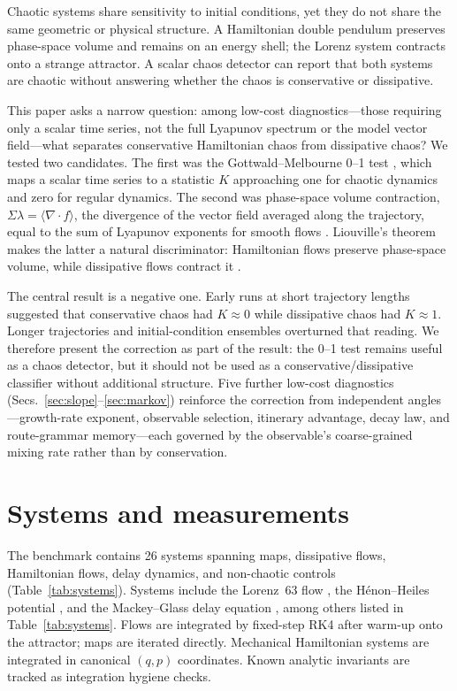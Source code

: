 \documentclass[11pt]{article}
\begin{document}
Chaotic systems share sensitivity to initial conditions, yet they do not share the
same geometric or physical structure. A Hamiltonian double pendulum preserves
phase-space volume and remains on an energy shell; the Lorenz system
\cite{lorenz1963} contracts onto a strange attractor. A scalar chaos detector can report that both systems are
chaotic without answering whether the chaos is conservative or dissipative.

This paper asks a narrow question: among low-cost diagnostics---those requiring only
a scalar time series, not the full Lyapunov spectrum or the model vector
field---what separates conservative Hamiltonian chaos from dissipative chaos? We
tested two candidates. The first was the Gottwald--Melbourne 0--1 test
\cite{gottwald2004,gottwald2009,falconer2007}, which maps a scalar time series to a
statistic $K$ approaching one for chaotic dynamics and zero for regular dynamics.
The second was phase-space volume contraction,
$\Sigma\lambda=\langle\nabla\!\cdot f\rangle$, the divergence of the vector field
averaged along the trajectory, equal to the sum of Lyapunov exponents for smooth
flows \cite{benettin1980,kantz2004}. Liouville's theorem makes the latter a
natural discriminator: Hamiltonian flows preserve phase-space volume, while
dissipative flows contract it \cite{strogatz1994}.

The central result is a negative one. Early runs at short trajectory lengths
suggested that conservative chaos had $K\approx0$ while dissipative chaos had
$K\approx1$. Longer trajectories and initial-condition ensembles overturned that
reading. We therefore present the correction as part of the result: the 0--1 test
remains useful as a chaos detector, but it should not be used as a
conservative/dissipative classifier without additional structure. Five further
low-cost diagnostics (Secs.~\ref{sec:slope}--\ref{sec:markov}) reinforce the
correction from independent angles---growth-rate exponent, observable selection,
itinerary advantage, decay law, and route-grammar memory---each governed by the
observable's coarse-grained mixing rate rather than by conservation.

\section{Systems and measurements}

The benchmark contains 26 systems spanning maps, dissipative flows, Hamiltonian
flows, delay dynamics, and non-chaotic controls (Table~\ref{tab:systems}). Systems
include the Lorenz~63 flow \cite{lorenz1963}, the H\'{e}non--Heiles potential
\cite{henon1964}, and the Mackey--Glass delay equation \cite{mackey1977}, among
others listed in Table~\ref{tab:systems}. Flows are integrated by fixed-step RK4
after warm-up onto the attractor; maps are iterated directly. Mechanical Hamiltonian
systems are integrated in canonical $(q,p)$ coordinates. Known analytic invariants
are tracked as integration hygiene checks.
\end{document}
